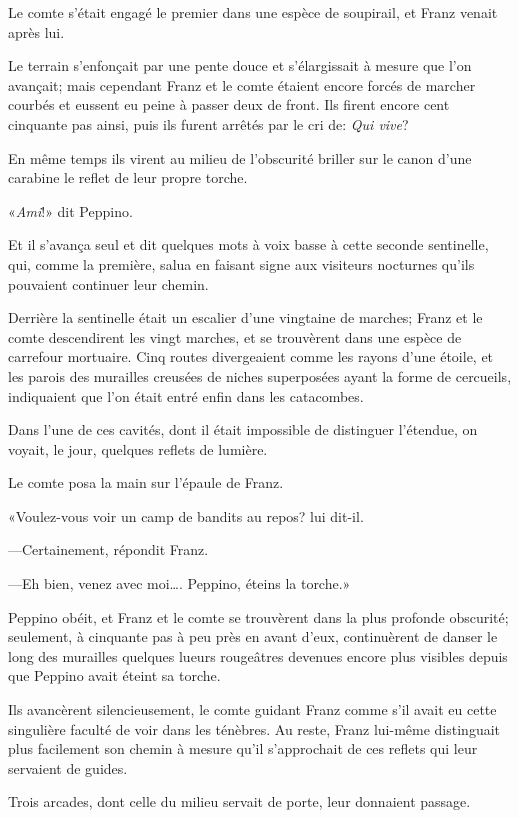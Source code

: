 Le comte s'était engagé le premier dans une espèce de soupirail, et Franz venait après lui. 

Le terrain s'enfonçait par une pente douce et s'élargissait à mesure que l'on avançait; mais cependant Franz et le comte étaient encore forcés de marcher courbés et eussent eu peine à passer deux de front. Ils firent encore cent cinquante pas ainsi, puis ils furent arrêtés par le cri de: \textit{Qui vive}? 

En même temps ils virent au milieu de l'obscurité briller sur le canon d'une carabine le reflet de leur propre torche. 

«\textit{Ami}!» dit Peppino. 

Et il s'avança seul et dit quelques mots à voix basse à cette seconde sentinelle, qui, comme la première, salua en faisant signe aux visiteurs nocturnes qu'ils pouvaient continuer leur chemin. 

Derrière la sentinelle était un escalier d'une vingtaine de marches; Franz et le comte descendirent les vingt marches, et se trouvèrent dans une espèce de carrefour mortuaire. Cinq routes divergeaient comme les rayons d'une étoile, et les parois des murailles creusées de niches superposées ayant la forme de cercueils, indiquaient que l'on était entré enfin dans les catacombes. 

Dans l'une de ces cavités, dont il était impossible de distinguer l'étendue, on voyait, le jour, quelques reflets de lumière. 

Le comte posa la main sur l'épaule de Franz. 

«Voulez-vous voir un camp de bandits au repos? lui dit-il. 

—Certainement, répondit Franz. 

—Eh bien, venez avec moi\dots. Peppino, éteins la torche.» 

Peppino obéit, et Franz et le comte se trouvèrent dans la plus profonde obscurité; seulement, à cinquante pas à peu près en avant d'eux, continuèrent de danser le long des murailles quelques lueurs rougeâtres devenues encore plus visibles depuis que Peppino avait éteint sa torche. 

Ils avancèrent silencieusement, le comte guidant Franz comme s'il avait eu cette singulière faculté de voir dans les ténèbres. Au reste, Franz lui-même distinguait plus facilement son chemin à mesure qu'il s'approchait de ces reflets qui leur servaient de guides. 

Trois arcades, dont celle du milieu servait de porte, leur donnaient passage. 

